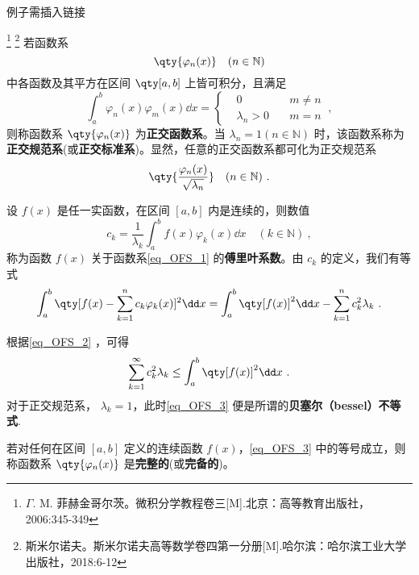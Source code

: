 \begin{issues}
例子需插入链接
\end{issues}

\footnote{$\Gamma$. M. 菲赫金哥尔茨。微积分学教程\;卷三[M].北京：高等教育出版社，2006:345-349}
\footnote{斯米尔诺夫。斯米尔诺夫高等数学卷四第一分册[M].哈尔滨：哈尔滨工业大学出版社，2018:6-12}
若函数系 
\begin{equation}\label{eq_OFS_1}
\qty{\varphi_n(x)}\quad(n\in \mathbb{N})
\end{equation}
中各函数及其平方在区间 $\qty[a,b]$ 上皆可积分，且满足
\begin{equation}
\int_a^b\varphi_n(x)\varphi_m(x)\dd x=
\left\{
    \begin{aligned}
    &0\quad &m\neq n\\
   &\lambda_n>0\quad &m=n
    \end{aligned}~,
\right.
\end{equation}
则称函数系 $\qty{\varphi_n(x)}$ 为\textbf{正交函数系}。当 $\lambda_n=1(n\in\mathbb{N})$ 时，该函数系称为\textbf{正交规范系}(或\textbf{正交标准系})。显然，任意的正交函数系都可化为正交规范系 
\begin{equation}
\qty{\frac{\varphi_n(x)}{\sqrt{\lambda_n}}}\quad(n\in \mathbb{N})~.
\end{equation}

设 $f(x)$ 是任一实函数，在区间 $[a,b]$ 内是连续的，则数值
\begin{equation}
c_k=\frac{1}{\lambda_k}\int_a^b f(x)\varphi_k(x)\dd x\quad (k\in \mathbb{N})~,
\end{equation}
称为函数 $f(x)$ 关于函数系\autoref{eq_OFS_1} 的\textbf{傅里叶系数}。由 $c_k$ 的定义，我们有等式
\begin{equation}\label{eq_OFS_2}
\int_a^b\qty[f(x)-\sum_{k=1}^nc_k\varphi_k(x)]^2\dd x=\int_a^b\qty[f(x)]^2\dd x-\sum_{k=1}^nc_k^2\lambda_k~.
\end{equation}

根据\autoref{eq_OFS_2} ，可得
\begin{equation}\label{eq_OFS_3}
\sum_{k=1}^\infty c_k^2\lambda_k\leq\int_a^b\qty[f(x)]^2\dd x~.
\end{equation}
对于正交规范系， $\lambda_k=1$，此时\autoref{eq_OFS_3} 便是所谓的\textbf{贝塞尔（bessel）不等式}. 

若对任何在区间 $[a,b]$ 定义的连续函数 $f(x)$，\autoref{eq_OFS_3} 中的等号成立，则称函数系 $\qty{\varphi_n(x)}$ 是\textbf{完整的}(或\textbf{完备的})。
